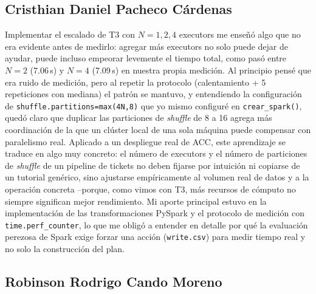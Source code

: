 \documentclass[11pt,a4paper]{article}
\begin{document}
\subsection*{Cristhian Daniel Pacheco C\'ardenas}

Implementar el escalado de T3 con $N=1,2,4$ executors me ense\~n\'o algo que
no era evidente antes de medirlo: agregar m\'as executors no solo puede dejar
de ayudar, puede incluso empeorar levemente el tiempo total, como pas\'o
entre $N=2$ (7.06\,s) y $N=4$ (7.09\,s) en nuestra propia medici\'on. Al
principio pens\'e que era ruido de medici\'on, pero al repetir la
protocolo (calentamiento + 5 repeticiones con mediana) el patr\'on se
mantuvo, y entendiendo la configuraci\'on de \texttt{shuffle.partitions=max(4N,8)}
que yo mismo configur\'e en \texttt{crear\_spark()}, qued\'o claro que
duplicar las particiones de \emph{shuffle} de 8 a 16 agrega m\'as
coordinaci\'on de la que un cl\'uster local de una sola m\'aquina puede
compensar con paralelismo real. Aplicado a un despliegue real de ACC, este
aprendizaje se traduce en algo muy concreto: el n\'umero de executors y el
n\'umero de particiones de \emph{shuffle} de un pipeline de tickets no deben
fijarse por intuici\'on ni copiarse de un tutorial gen\'erico, sino ajustarse
emp\'iricamente al volumen real de datos y a la operaci\'on concreta
--porque, como vimos con T3, m\'as recursos de c\'omputo no siempre significan
mejor rendimiento. Mi aporte principal estuvo en la implementaci\'on de las
transformaciones PySpark y el protocolo de medici\'on con
\texttt{time.perf\_counter}, lo que me oblig\'o a entender en detalle por
qu\'e la evaluaci\'on perezosa de Spark exige forzar una acci\'on
(\texttt{write.csv}) para medir tiempo real y no solo la construcci\'on del
plan.

\subsection*{Robinson Rodrigo Cando Moreno}
\end{document}
